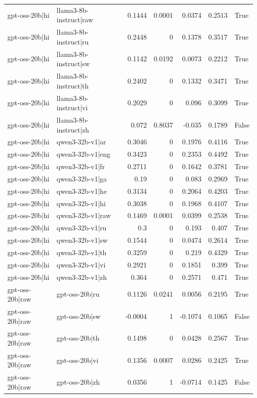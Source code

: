 \begin{table}
\begin{tabular}{l l r r r r l}
gpt-oss-20b|hi & llama3-8b-instruct|raw & 0.1444 & 0.0001 & 0.0374 & 0.2513 & True \\
gpt-oss-20b|hi & llama3-8b-instruct|ru & 0.2448 & 0 & 0.1378 & 0.3517 & True \\
gpt-oss-20b|hi & llama3-8b-instruct|sw & 0.1142 & 0.0192 & 0.0073 & 0.2212 & True \\
gpt-oss-20b|hi & llama3-8b-instruct|th & 0.2402 & 0 & 0.1332 & 0.3471 & True \\
gpt-oss-20b|hi & llama3-8b-instruct|vi & 0.2029 & 0 & 0.096 & 0.3099 & True \\
gpt-oss-20b|hi & llama3-8b-instruct|zh & 0.072 & 0.8037 & -0.035 & 0.1789 & False \\
gpt-oss-20b|hi & qwen3-32b-v1|ar & 0.3046 & 0 & 0.1976 & 0.4116 & True \\
gpt-oss-20b|hi & qwen3-32b-v1|eng & 0.3423 & 0 & 0.2353 & 0.4492 & True \\
gpt-oss-20b|hi & qwen3-32b-v1|fr & 0.2711 & 0 & 0.1642 & 0.3781 & True \\
gpt-oss-20b|hi & qwen3-32b-v1|ga & 0.19 & 0 & 0.083 & 0.2969 & True \\
gpt-oss-20b|hi & qwen3-32b-v1|he & 0.3134 & 0 & 0.2064 & 0.4203 & True \\
gpt-oss-20b|hi & qwen3-32b-v1|hi & 0.3038 & 0 & 0.1968 & 0.4107 & True \\
gpt-oss-20b|hi & qwen3-32b-v1|raw & 0.1469 & 0.0001 & 0.0399 & 0.2538 & True \\
gpt-oss-20b|hi & qwen3-32b-v1|ru & 0.3 & 0 & 0.193 & 0.407 & True \\
gpt-oss-20b|hi & qwen3-32b-v1|sw & 0.1544 & 0 & 0.0474 & 0.2614 & True \\
gpt-oss-20b|hi & qwen3-32b-v1|th & 0.3259 & 0 & 0.219 & 0.4329 & True \\
gpt-oss-20b|hi & qwen3-32b-v1|vi & 0.2921 & 0 & 0.1851 & 0.399 & True \\
gpt-oss-20b|hi & qwen3-32b-v1|zh & 0.364 & 0 & 0.2571 & 0.471 & True \\
gpt-oss-20b|raw & gpt-oss-20b|ru & 0.1126 & 0.0241 & 0.0056 & 0.2195 & True \\
gpt-oss-20b|raw & gpt-oss-20b|sw & -0.0004 & 1 & -0.1074 & 0.1065 & False \\
gpt-oss-20b|raw & gpt-oss-20b|th & 0.1498 & 0 & 0.0428 & 0.2567 & True \\
gpt-oss-20b|raw & gpt-oss-20b|vi & 0.1356 & 0.0007 & 0.0286 & 0.2425 & True \\
gpt-oss-20b|raw & gpt-oss-20b|zh & 0.0356 & 1 & -0.0714 & 0.1425 & False \\

\end{tabular}
\end{table}

